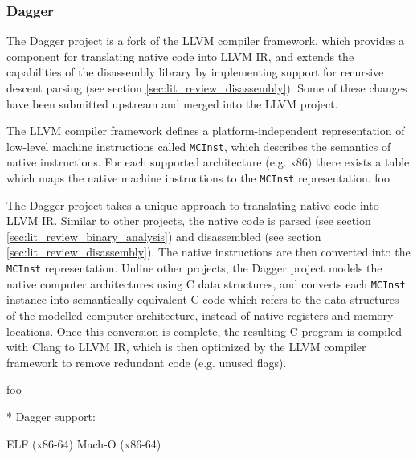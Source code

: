 
\subsubsection{Dagger}

The Dagger project is a fork of the LLVM compiler framework, which provides a component for translating native code into LLVM IR, and extends the capabilities of the disassembly library by implementing support for recursive descent parsing (see section \ref{sec:lit_review_disassembly}). Some of these changes have been submitted upstream and merged into the LLVM project.

The LLVM compiler framework defines a platform-independent representation of low-level machine instructions called \texttt{MCInst}, which describes the semantics of native instructions. For each supported architecture (e.g. x86) there exists a table which maps the native machine instructions to the \texttt{MCInst} representation. foo

The Dagger project takes a unique approach to translating native code into LLVM IR. Similar to other projects, the native code is parsed (see section \ref{sec:lit_review_binary_analysis}) and disassembled (see section \ref{sec:lit_review_disassembly}). The native instructions are then converted into the \texttt{MCInst} representation. Unline other projects, the Dagger project models the native computer architectures using C data structures, and converts each \texttt{MCInst} instance into semantically equivalent C code which refers to the data structures of the modelled computer architecture, instead of native registers and memory locations. Once this conversion is complete, the resulting C program is compiled with Clang to LLVM IR, which is then optimized by the LLVM compiler framework to remove redundant code (e.g. unused flags).

foo \cite{dagger}


* Dagger support:

ELF (x86-64)
Mach-O (x86-64)
